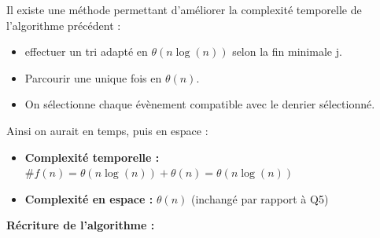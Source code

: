 \documentclass{article}
\begin{document}
Il existe une méthode permettant d'améliorer la complexité temporelle de l'algorithme précédent : 
\begin{itemize}
    \item effectuer un tri adapté en $ \theta(n \log (n)) $ selon la fin minimale j. 
    \item Parcourir une unique fois en $ \theta(n) $.
    \item On sélectionne chaque évènement compatible avec le denrier sélectionné.
\end{itemize}
Ainsi on aurait en temps, puis en espace : 
\begin{itemize}
    \item \textbf{Complexité temporelle :} $ \#f(n) = \theta(n \log (n)) + \theta(n) = \theta (n \log (n)) $
    \item \textbf{Complexité en espace : } $ \theta(n) $ (inchangé par rapport à Q5)
\end{itemize}

\textbf{Récriture de l'algorithme : }

\end{document}
